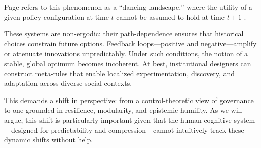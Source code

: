 \documentclass[12pt]{article}  %
\begin{document}
Page refers to this phenomenon as a “dancing landscape,” where the utility of a given policy configuration at time \( t \) cannot be assumed to hold at time \( t+1 \) \parencite{page2011diversity}.

These systems are non-ergodic: their path-dependence ensures that historical choices constrain future options. Feedback loops—positive and negative—amplify or attenuate innovations unpredictably. Under such conditions, the notion of a stable, global optimum becomes incoherent. At best, institutional designers can construct meta-rules that enable localized experimentation, discovery, and adaptation across diverse social contexts.

This demands a shift in perspective: from a control-theoretic view of governance to one grounded in resilience, modularity, and epistemic humility. As we will argue, this shift is particularly important given that the human cognitive system—designed for predictability and compression—cannot intuitively track these dynamic shifts without help.


\newpage
\printbibliography
\end{document}
